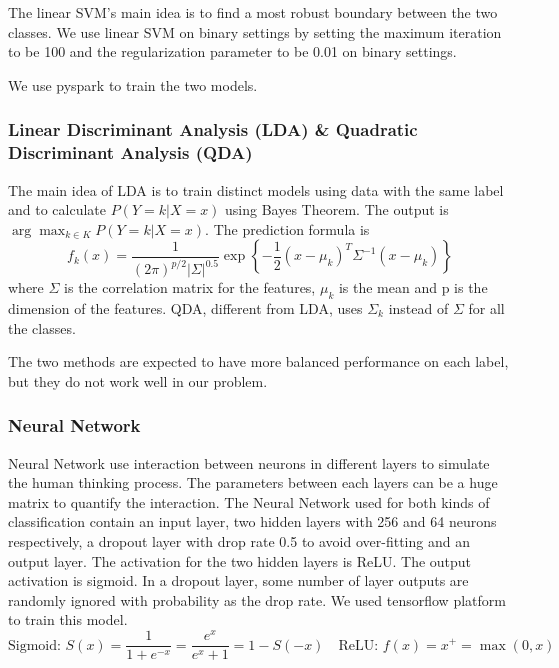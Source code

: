\documentclass{article}
\begin{document}
The linear SVM's main idea is to find a most robust boundary between the two classes. We use linear SVM on binary settings by setting the maximum iteration to be 100 and the regularization parameter to be 0.01 on binary settings. 

We use pyspark to train the two models.

\subsubsection{Linear Discriminant Analysis (LDA) \& Quadratic Discriminant Analysis (QDA)}
The main idea of LDA is to train distinct models using data with the same label and to calculate $P(Y = k| X = x)$ using Bayes Theorem. The output is $\arg\max_{k \in K} P(Y = k| X = x)$. The prediction formula is 
$$
f_k(x) = \frac{1}{(2\pi)^{p/2} |\Sigma|^{0.5}} \exp \left\{-\frac{1}{2}(x-\mu_k)^T\Sigma^{-1}(x - \mu_k)\right\}
$$
where $\Sigma$ is the correlation matrix for the features, $\mu_k$ is the mean and p is the dimension of the features. QDA, different from LDA, uses $\Sigma_k$ instead of $\Sigma$ for all the classes. 

The two methods are expected to have more balanced performance on each label, but they do not work well in our problem. 

\subsubsection{Neural Network}
Neural Network use interaction between neurons in different layers to simulate the human thinking process. The parameters between each layers can be a huge matrix to quantify the interaction. The Neural Network used for both kinds of classification contain an input layer, two hidden layers with 256 and 64 neurons respectively, a dropout layer with drop rate 0.5 to avoid over-fitting and an output layer. The activation for the two hidden layers is ReLU. The output activation is sigmoid. In a dropout layer, some number of layer outputs are randomly ignored with probability as the drop rate. We used tensorflow platform to train this model. 
\begin{equation}
        \text{Sigmoid: }  {\displaystyle S(x)={\frac {1}{1+e^{-x}}}={\frac {e^{x}}{e^{x}+1}}=1-S(-x)} \quad
        \text{ReLU: }{\displaystyle f(x)=x^{+}=\max(0,x)}
\end{equation}
\end{document}
